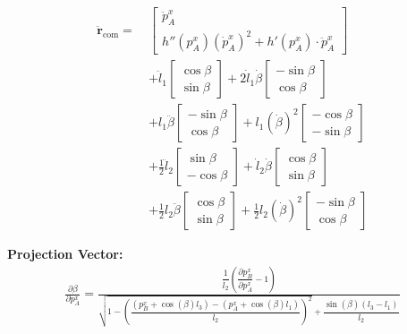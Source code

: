 \documentclass[10pt]{article}
\begin{document}
\begin{align*}
\ddot{\mathbf{r}}_{\text{com}} =\ &
\begin{bmatrix}
\ddot{p}_A^x \\
h''(p_A^x)(\dot{p}_A^x)^2 + h'(p_A^x) \cdot \ddot{p}_A^x
\end{bmatrix} \\
&+
\ddot{l}_1
\begin{bmatrix}
\cos\beta \\
\sin\beta
\end{bmatrix}
+
2 \dot{l}_1 \dot{\beta}
\begin{bmatrix}
-\sin\beta \\
\cos\beta
\end{bmatrix} \\
&+
l_1 \ddot{\beta}
\begin{bmatrix}
-\sin\beta \\
\cos\beta
\end{bmatrix}
+
l_1 (\dot{\beta})^2
\begin{bmatrix}
-\cos\beta \\
-\sin\beta
\end{bmatrix} \\
&+
\frac{1}{2} \ddot{l}_2
\begin{bmatrix}
\sin\beta \\
-\cos\beta
\end{bmatrix}
+
\dot{l}_2 \dot{\beta}
\begin{bmatrix}
\cos\beta \\
\sin\beta
\end{bmatrix} \\
&+
\frac{1}{2} l_2 \ddot{\beta}
\begin{bmatrix}
\cos\beta \\
\sin\beta
\end{bmatrix}
+
\frac{1}{2} l_2 (\dot{\beta})^2
\begin{bmatrix}
-\sin\beta \\
\cos\beta
\end{bmatrix}
\end{align*}

\textbf{Projection Vector: }
\begin{align*}
\frac{\partial \beta}{\partial p_A^x}
= \frac{ \dfrac{1}{l_2} \left( \dfrac{\partial p_B^x}{\partial p_A^x} - 1 \right) }
{ \sqrt{1 - \left( \dfrac{(p_B^x + \cos(\beta) l_3) - (p_A^x + \cos(\beta) l_1)}{l_2} \right)^2 }
+ \dfrac{\sin(\beta)(l_3 - l_1)}{l_2} }
\end{align*}
\end{document}
